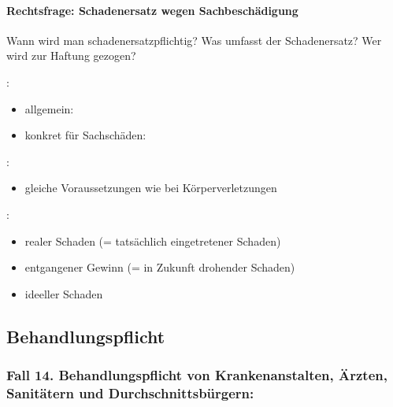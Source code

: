 \paragraph{Rechtsfrage: Schadenersatz wegen Sachbeschädigung}

Wann wird man schadenersatzpflichtig? Was umfasst der Schadenersatz? Wer
wird zur Haftung gezogen?


:

\begin{itemize}
    \item allgemein: 
    \item konkret für Sachschäden: 
\end{itemize}

:

\begin{itemize}
    \item gleiche Voraussetzungen wie bei Körperverletzungen
\end{itemize}

:

\begin{itemize}
    \item realer Schaden (= tatsächlich eingetretener Schaden)
    \item entgangener Gewinn (= in Zukunft drohender Schaden)
    \item ideeller Schaden
\end{itemize}




\subsection{Behandlungspflicht}

\subsubsection{Fall 14. Behandlungspflicht von Krankenanstalten, Ärzten,
Sanitätern und Durchschnittsbürgern:}

